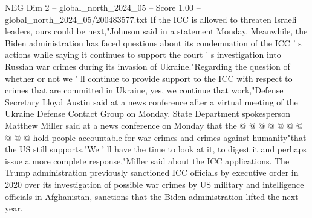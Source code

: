 \begin{textsample}{NEG Dim 2 – global\_north\_2024\_05 – Score 1.00 – global\_north\_2024\_05/200483577.txt}
If the ICC is allowed to threaten Israeli leaders, ours could be next,"Johnson said in a statement Monday.
Meanwhile, the Biden administration has faced questions about its condemnation of the ICC ' s actions while saying it continues to support the court ' s investigation into Russian war crimes during its invasion of Ukraine."Regarding the question of whether or not we ' ll continue to provide support to the ICC with respect to crimes that are committed in Ukraine, yes, we continue that work,"Defense Secretary Lloyd Austin said at a news conference after a virtual meeting of the Ukraine Defense Contact Group on Monday.
State Department spokesperson Matthew Miller said at a news conference on Monday that the @ @ @ @ @ @ @ @ @ @ hold people accountable for war crimes and crimes against humanity"that the US still supports."We ' ll have the time to look at it, to digest it and perhaps issue a more complete response,"Miller said about the ICC applications.
The Trump administration previously sanctioned ICC officials by executive order in 2020 over its investigation of possible war crimes by US military and intelligence officials in Afghanistan, sanctions that the Biden administration lifted the next year.

\end{textsample}
